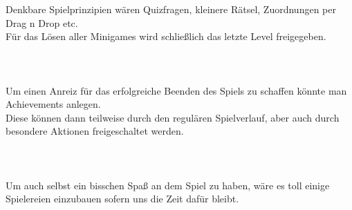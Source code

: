 \documentclass[10pt,a4paper,notitlepage]{report}
\begin{document}
	Denkbare Spielprinzipien wären Quizfragen, kleinere Rätsel, Zuordnungen per Drag n Drop etc.\\
	Für das Lösen aller Minigames wird schließlich das letzte Level freigegeben.\\
	\\
	\
	\\\\
	\Text
		Um einen Anreiz für das erfolgreiche Beenden des Spiels zu schaffen könnte man Achievements anlegen.\\
	Diese können dann teilweise durch den regulären Spielverlauf, aber auch durch besondere Aktionen freigeschaltet werden.\\
	\\
	\\\\
	\Text
		Um auch selbst ein bisschen Spaß an dem Spiel zu haben, wäre es toll einige Spielereien einzubauen sofern uns die Zeit dafür bleibt.\\
	\\
	\Fusszeile
\end{document}
